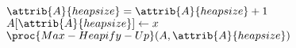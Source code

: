 \begin{codebox}
\li $\attrib{A}{heapsize} = \attrib{A}{heapsize} + 1$
\li $A[\attrib{A}{heapsize}] \gets x$
\li $\proc{Max-Heapify-Up}(A,\attrib{A}{heapsize})$
\end{codebox}